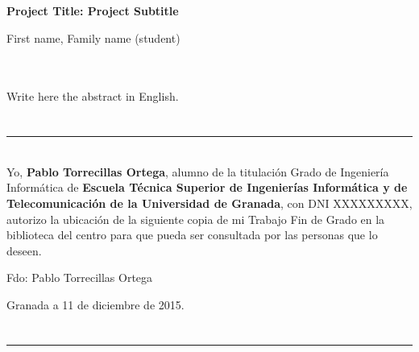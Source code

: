 \cleardoublepage


\thispagestyle{empty}


\begin{center}
{\large\bfseries Project Title: Project Subtitle}\\
\end{center}
\begin{center}
First name, Family name (student)\\
\end{center}

\\

\vspace{0.7cm}
\\

Write here the abstract in English.

\chapter*{}
\thispagestyle{empty}

\noindent\rule[-1ex]{\textwidth}{2pt}\\[4.5ex]

Yo, \textbf{Pablo Torrecillas Ortega}, alumno de la titulación Grado de Ingeniería Informática de  \textbf{Escuela Técnica Superior
de Ingenierías Informática y de Telecomunicación de la Universidad de Granada}, con DNI XXXXXXXXX, autorizo la
ubicación de la siguiente copia de mi Trabajo Fin de Grado en la biblioteca del centro para que pueda ser
consultada por las personas que lo deseen.

\vspace{6cm}

\noindent Fdo: Pablo Torrecillas Ortega

\vspace{2cm}

\begin{flushright}
Granada a 11 de diciembre de 2015.
\end{flushright}


\chapter*{}
\thispagestyle{empty}

\noindent\rule[-1ex]{\textwidth}{2pt}\\[4.5ex]

